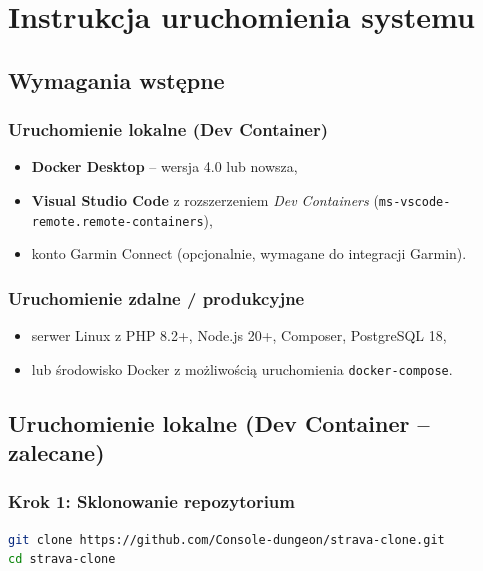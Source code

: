 \documentclass[12pt,a4paper]{report}
\begin{document}
\chapter{Instrukcja uruchomienia systemu}
\label{ch:uruchomienie}

\section{Wymagania wstępne}

\subsection{Uruchomienie lokalne (Dev Container)}

\begin{itemize}[noitemsep]
    \item \textbf{Docker Desktop} -- wersja 4.0 lub nowsza,
    \item \textbf{Visual Studio Code} z rozszerzeniem \textit{Dev Containers} (\texttt{ms-vscode-remote.remote-containers}),
    \item konto Garmin Connect (opcjonalnie, wymagane do integracji Garmin).
\end{itemize}

\subsection{Uruchomienie zdalne / produkcyjne}

\begin{itemize}[noitemsep]
    \item serwer Linux z PHP 8.2+, Node.js 20+, Composer, PostgreSQL 18,
    \item lub środowisko Docker z możliwością uruchomienia \texttt{docker-compose}.
\end{itemize}

\section{Uruchomienie lokalne (Dev Container -- zalecane)}

\subsection{Krok 1: Sklonowanie repozytorium}

\begin{lstlisting}[language=bash, numbers=none]
git clone https://github.com/Console-dungeon/strava-clone.git
cd strava-clone
\end{lstlisting}
\end{document}
